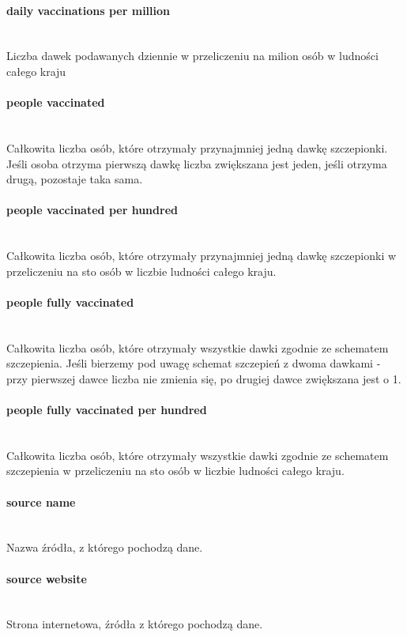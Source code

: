 \documentclass[12pt, oneside]{article}
\begin{document}
\paragraph{daily vaccinations per million}
\mbox{}\\
Liczba dawek podawanych dziennie w przeliczeniu na milion osób w ludności całego kraju

\paragraph{people vaccinated}
\mbox{}\\
Całkowita liczba osób, które otrzymały przynajmniej jedną dawkę szczepionki. Jeśli osoba otrzyma pierwszą dawkę liczba zwiększana jest jeden, jeśli otrzyma drugą, pozostaje taka sama. 

\paragraph{people vaccinated per hundred}
\mbox{}\\
Całkowita liczba osób, które otrzymały przynajmniej jedną dawkę szczepionki w przeliczeniu na sto osób w liczbie ludności całego kraju.

\paragraph{people fully vaccinated}
\mbox{}\\
Całkowita liczba osób, które otrzymały wszystkie dawki zgodnie ze schematem szczepienia. Jeśli bierzemy pod uwagę schemat szczepień z dwoma dawkami - przy pierwszej dawce liczba nie zmienia się, po drugiej dawce zwiększana jest o 1. 

\paragraph{people fully vaccinated per hundred}
\mbox{}\\
Całkowita liczba osób, które otrzymały wszystkie dawki zgodnie ze schematem szczepienia w przeliczeniu na sto osób w liczbie ludności całego kraju.

\paragraph{source name}
\mbox{}\\
Nazwa źródła, z którego pochodzą dane.

\paragraph{source website}
\mbox{}\\
Strona internetowa, źródła z którego pochodzą dane. 
\end{document}
